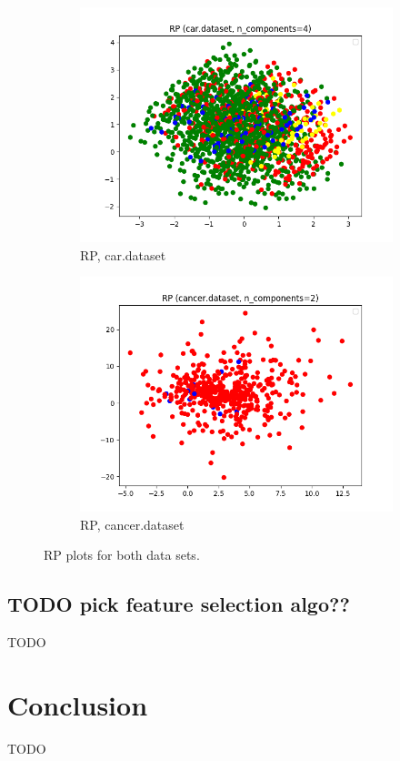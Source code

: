 \documentclass{article}
\begin{document}
\begin{figure}[htb]
        \begin{subfigure}{0.4\textwidth}
          \includegraphics[width=\linewidth]{out/rp/car-rp-comp-4.png}
          \caption{RP, car.dataset}
          \label{fig:rp-plot-car}
        \end{subfigure}\hfil
        \begin{subfigure}{0.4\textwidth}
          \includegraphics[width=\linewidth]{out/rp/cancer-rp-comp-2.png}
          \caption{RP, cancer.dataset}
          \label{fig:rp-plot-cancer}
        \end{subfigure}

      \caption{RP plots for both data sets.}
      \label{fig:rp-plot}
      \end{figure}

    \subsection{TODO pick feature selection algo??}
      TODO

  \section{Conclusion}
    TODO
\end{document}

